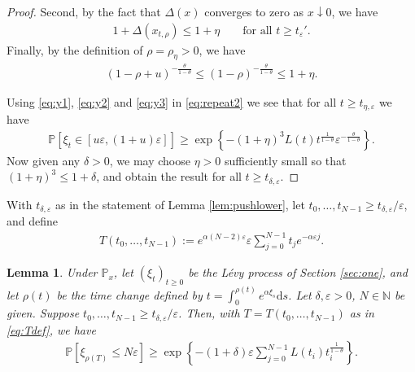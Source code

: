 \documentclass[a4,12pt]{amsart}
\numberwithin{equation}{section}
\newtheorem{lemma}[thm]{Lemma}
\begin{document}
\begin{proof}
Second, by the fact that $\Delta(x)$ converges to zero as $x \downarrow 0$, we have
\begin{align} \label{eq:y2}
1+\Delta(x_{t,\rho}) \leq 1 + \eta \qquad \text{for all $t \geq t_\varepsilon'$}.
\end{align}
Finally, by the definition of $\rho = \rho_\eta > 0$, we have
\begin{align} \label{eq:y3}
(1- \rho + u)^{ - \frac{\theta}{1-\theta}} \leq (1- \rho)^{ - \frac{\theta}{1-\theta}}  \leq 1 + \eta.
\end{align} 

Using \eqref{eq:y1}, \eqref{eq:y2} and \eqref{eq:y3} in \eqref{eq:repeat2} we see that for all $t \geq t_{\eta,\varepsilon}$ we have 
\begin{align}  \label{eq:repeat3}
\mathbb{P}\left[ \xi_t \in [u\varepsilon,(1+u)\varepsilon] \right] \geq  \exp \left\{ - (1+\eta)^3 L(t)t^{ \frac{1}{1-\theta}} \varepsilon^{ - \frac{\theta}{1-\theta}}  \right\}.
\end{align}
Now given any $\delta > 0$, we may choose $\eta > 0$ sufficiently small so that $(1+\eta)^3 \leq 1 + \delta$, and obtain the result for all $t \geq t_{\delta,\varepsilon}$. 

	\end{proof} 

	With $t_{\delta,\varepsilon}$ as in the statement of Lemma \ref{lem:pushlower}, 
	let $t_0,\ldots,t_{N-1} \geq t_{\delta,\varepsilon}/\varepsilon$, and define
	\begin{align} \label{eq:Tdef}
		T(t_0,\ldots,t_{N-1}) 
		:= e^{ \alpha ( N - 2 )\varepsilon } \varepsilon 
		\sum_{ j = 0 }^{N-1} t_j e^{ - \alpha \varepsilon j } .
	\end{align}


	\begin{lemma} \label{lem:carefulbound}
		Under $\mathbb{P}_x$, let $(\xi_t)_{t \geq 0}$ be the L\'evy process 
		of Section \ref{sec:one}, and let $\rho(t)$ be the time change 
		defined by $t = \int_0^{\rho(t)} e^{\alpha \xi_s} \mathrm{d}s$. 
		Let $\delta,\varepsilon> 0$, $N\in \mathbb{N}$ be given. 
		Suppose $t_0,\ldots,t_{N-1} \geq t_{\delta,\varepsilon}/\varepsilon$.
		Then, with $T = T(t_0,\ldots,t_{N-1})$ as in \eqref{eq:Tdef}, we have
		\begin{align*}
			\mathbb{P} \left[ \xi_{\rho(T)} \leq N \varepsilon \right]
			\geq \exp \left\{ - (1+\delta) \varepsilon 
			\sum_{ j = 0}^{N-1}L( t_i) t_i^{ \frac{1}{1-\theta}} \right\}.
		\end{align*}
	\end{lemma}
\end{document}
